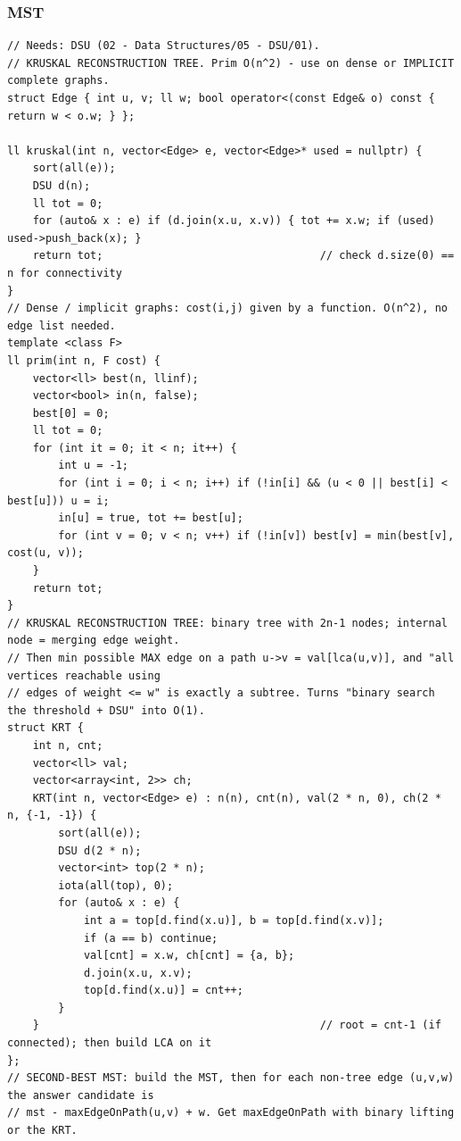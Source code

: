 \documentclass[9pt,a4paper,twocolumn]{extarticle}
\begin{document}
\subsubsection{MST}
\nopagebreak
\begin{lstlisting}
// Needs: DSU (02 - Data Structures/05 - DSU/01).
// KRUSKAL RECONSTRUCTION TREE. Prim O(n^2) - use on dense or IMPLICIT complete graphs.
struct Edge { int u, v; ll w; bool operator<(const Edge& o) const { return w < o.w; } };

ll kruskal(int n, vector<Edge> e, vector<Edge>* used = nullptr) {
    sort(all(e));
    DSU d(n);
    ll tot = 0;
    for (auto& x : e) if (d.join(x.u, x.v)) { tot += x.w; if (used) used->push_back(x); }
    return tot;                                  // check d.size(0) == n for connectivity
}
// Dense / implicit graphs: cost(i,j) given by a function. O(n^2), no edge list needed.
template <class F>
ll prim(int n, F cost) {
    vector<ll> best(n, llinf);
    vector<bool> in(n, false);
    best[0] = 0;
    ll tot = 0;
    for (int it = 0; it < n; it++) {
        int u = -1;
        for (int i = 0; i < n; i++) if (!in[i] && (u < 0 || best[i] < best[u])) u = i;
        in[u] = true, tot += best[u];
        for (int v = 0; v < n; v++) if (!in[v]) best[v] = min(best[v], cost(u, v));
    }
    return tot;
}
// KRUSKAL RECONSTRUCTION TREE: binary tree with 2n-1 nodes; internal node = merging edge weight.
// Then min possible MAX edge on a path u->v = val[lca(u,v)], and "all vertices reachable using
// edges of weight <= w" is exactly a subtree. Turns "binary search the threshold + DSU" into O(1).
struct KRT {
    int n, cnt;
    vector<ll> val;
    vector<array<int, 2>> ch;
    KRT(int n, vector<Edge> e) : n(n), cnt(n), val(2 * n, 0), ch(2 * n, {-1, -1}) {
        sort(all(e));
        DSU d(2 * n);
        vector<int> top(2 * n);
        iota(all(top), 0);
        for (auto& x : e) {
            int a = top[d.find(x.u)], b = top[d.find(x.v)];
            if (a == b) continue;
            val[cnt] = x.w, ch[cnt] = {a, b};
            d.join(x.u, x.v);
            top[d.find(x.u)] = cnt++;
        }
    }                                            // root = cnt-1 (if connected); then build LCA on it
};
// SECOND-BEST MST: build the MST, then for each non-tree edge (u,v,w) the answer candidate is
// mst - maxEdgeOnPath(u,v) + w. Get maxEdgeOnPath with binary lifting or the KRT.
\end{lstlisting}
\end{document}

